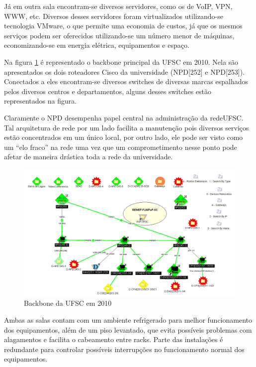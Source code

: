 \documentclass[brazil,times]{abnt}
\begin{document}
Já em outra sala encontram-se diversos servidores, como os de
VoIP, VPN, WWW, etc. Diversos desses servidores foram virtualizados
utilizando-se tecnologia VMware, o que permite uma economia de custos, já que os
mesmos serviços podem ser oferecidos utilizando-se um número menor de máquinas,
economizando-se em energia elétrica, equipamentos e espaço.

Na figura \ref{backbone-ufsc} é representado o backbone principal da UFSC em
2010. Nela são apresentados os dois roteadores Cisco da universidade (NPD[252]
e NPD[253]). Conectados a eles encontram-se diversos switches de diversas
marcas espalhados pelos diversos centros e departamentos, alguns desses switches
estão representados na figura.

Claramente o NPD desempenha papel central na administração da redeUFSC. Tal
arquitetura de rede por um lado facilita a manutenção pois diversos serviços
estão concentrados em um único local, por outro lado, ele pode ser visto como
um ``elo fraco'' na rede uma vez que um comprometimento nesse ponto pode afetar
de maneira drástica toda a rede da universidade.

\begin{figure}[htp]
\begin{center}
  \includegraphics[width=150mm]{imagens/Topo-Mapa.png}
  \caption[Backbone da UFSC em 2010]{Backbone da UFSC em 2010}
  \label{backbone-ufsc}
\end{center}
\end{figure}

Ambas as salas contam com um ambiente refrigerado para melhor funcionamento dos
equipamentos, além de um piso levantado, que evita possíveis problemas com
alagamentos e facilita o cabeamento entre racks. Parte das instalações é
redundante para controlar possíveis interrupções no funcionamento normal dos
equipamentos.
\end{document}

